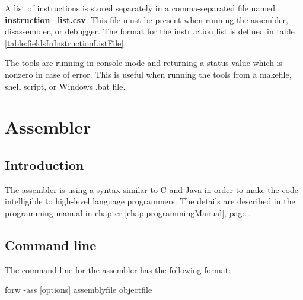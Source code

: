 \documentclass[forwardcom.tex]{subfiles}
\begin{document}
A list of instructions is stored separately in a comma-separated file named \textbf{instruction\_list.csv}. This file must be present when running the assembler, disassembler, or debugger. The format for the instruction list is defined in table \ref{table:fieldsInInstructionListFile}.
\vv

The tools are running in console mode and returning a status value which is nonzero in case of error. This is useful when running the tools from a makefile, shell script, or Windows .bat file.
\vv

\section{Assembler}\label{chap:assembler}
\subsection{Introduction} \label{assemblerIntroduction}
The assembler is using a syntax similar to C and Java in order to make the code intelligible to high-level language programmers. 
The details are described in the programming manual in chapter 
\ref{chap:programmingManual}, page \pageref{chap:programmingManual}.
\vv

\subsection{Command line} \label{assemblerCommandLine}
The command line for the assembler has the following format:

\vv
\hspace{5mm} {\ttfamily forw -ass [options] assemblyfile objectfile}
\end{document}
